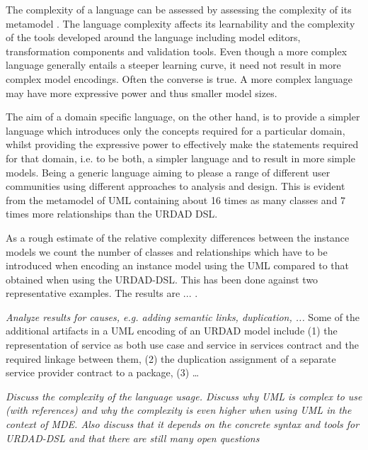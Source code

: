 The complexity of a language can be assessed by assessing the complexity of its metamodel \cite{mohagheghi_evaluating_2007}. The language complexity affects its learnability and the complexity of the tools developed around the language including model editors, transformation components and validation tools. Even though a more complex language generally entails a steeper learning curve, it need not result in more complex model encodings. Often the converse is true. A more complex language may have more expressive power and thus smaller model sizes. 

The aim of a domain specific language, on the other hand, is to provide a simpler language which introduces only the concepts required for a particular domain, whilst providing the expressive power to effectively make the statements required for that domain, i.e. to be both, a simpler language and to result in more simple models. Being a generic language aiming to please a range of different user communities using different approaches to analysis and design. This is evident from the metamodel of UML containing about 16 times as many classes and 7 times more relationships than the URDAD DSL.

As a rough estimate of the relative complexity differences between the instance models we count the number of classes and relationships which have to be introduced when encoding an instance model using the UML compared to that obtained when using the URDAD-DSL. This has been done against two representative examples. The results are ... . 


\emph{Analyze results for causes, e.g. adding semantic links, duplication, ...} Some of the additional artifacts in a UML encoding of an URDAD model include (1) the representation of service as both use case and service in services contract and the required linkage between them, (2) the duplication assignment of a separate service provider contract to a package, (3) \dots

\emph{Discuss the complexity of the language usage. Discuss why UML is complex to use (with references) and why the complexity is even higher when using UML in the context of MDE. Also discuss that it depends on the concrete syntax and tools for URDAD-DSL and that there are still many open questions}


